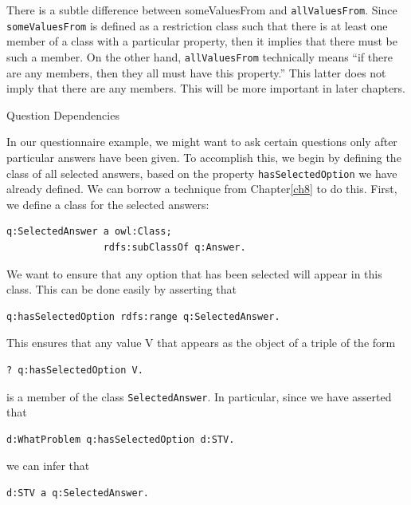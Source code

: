 There is a subtle difference between someValuesFrom and \texttt{allValuesFrom}.
Since
\texttt{someValuesFrom} is defined as a restriction class such that there is at
least one member of a class with a particular property, then it implies
that there must be such a member. On the other hand, \texttt{allValuesFrom}
technically means ``if there are any members, then they all must have
this property.'' This latter does not imply that there are any members.
This will be more important in later chapters.

\begin{example}{Question Dependencies}

In our questionnaire example, we might want to ask certain questions
only after particular answers have been given. To accomplish this, we
begin by defining the class of all selected answers, based on the
property \texttt{hasSelectedOption} we have already defined. We can borrow a
technique from Chapter\ref{ch8} to do this. First, we define a class for the
selected answers:

\begin{lstlisting}
q:SelectedAnswer a owl:Class;
                 rdfs:subClassOf q:Answer.
\end{lstlisting}

We want to ensure that any option that has been selected will appear in
this class. This can be done easily by asserting that

\begin{lstlisting}
q:hasSelectedOption rdfs:range q:SelectedAnswer.
\end{lstlisting}

This ensures that any value V that appears as the object of a triple of
the form

\begin{lstlisting}
? q:hasSelectedOption V.
\end{lstlisting}

is a member of the class \texttt{SelectedAnswer}. In particular, since we have
asserted that

\begin{lstlisting}
d:WhatProblem q:hasSelectedOption d:STV.
\end{lstlisting}

we can infer that

\begin{lstlisting}
d:STV a q:SelectedAnswer.
\end{lstlisting}

\end{example}

